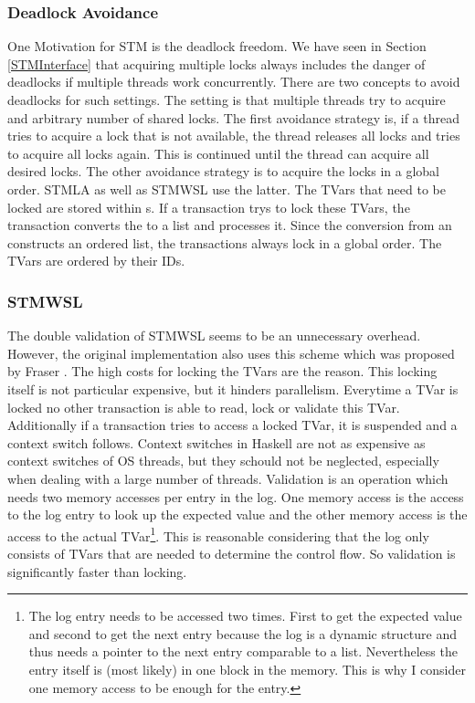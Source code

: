 \subsubsection{Deadlock Avoidance}
One Motivation for STM is the deadlock freedom. We have seen in Section \ref{STMInterface} that acquiring 
multiple locks always includes the danger of deadlocks if multiple threads work concurrently. 
There are two concepts to avoid deadlocks for such settings. The setting is that multiple threads
try to acquire and arbitrary number of shared locks. The first avoidance strategy is, if a thread tries to 
acquire a lock that is not available, the thread releases all locks and tries to acquire all locks again.
This is continued until the thread can acquire all desired locks. The other avoidance strategy is to 
acquire the locks in a global order. STMLA as well as STMWSL use the latter. The TVars that need to be 
locked are stored within s. If a transaction trys to lock these TVars, the transaction converts 
the  to a list and processes it. Since the conversion from an  constructs an ordered 
list, the transactions always lock in a global order. The TVars are ordered by their IDs.


\subsubsection{STMWSL}
The double validation of STMWSL seems to be an unnecessary overhead. However, the original implementation 
also uses this scheme which was proposed by Fraser \parencite[Page 42]{lockfreedom}. The high costs for locking the TVars
are the reason. This locking itself is not particular expensive, but it hinders parallelism.
Everytime a TVar is locked no other transaction is able to read, lock or validate this TVar. Additionally if 
a transaction tries to access a locked TVar, it is suspended and a context switch follows. Context switches in Haskell 
are not as expensive as context switches of OS threads, but they schould not be neglected, especially when dealing
with a large number of threads. Validation is an operation which needs two memory accesses per entry in the log.
One memory access is the access to the log entry to look up the expected value and the other memory access is
the access to the actual TVar\footnote{The log entry needs to be accessed two times. First to get the expected
value and second to get the next entry because the log is a dynamic structure and thus needs a pointer
to the next entry comparable to a list. Nevertheless the entry itself is (most likely) in one block in the memory.
This is why I consider one memory access to be enough for the entry.}. This is reasonable considering that the 
log only consists of TVars that are needed to determine the control flow. So validation is significantly faster
than locking. 

